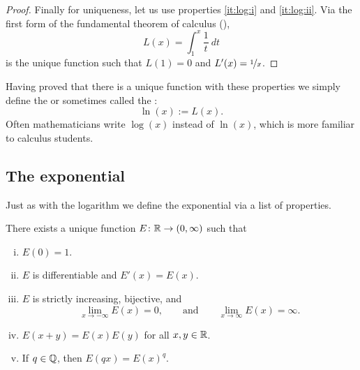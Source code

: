 \begin{proof}
Finally for uniqueness, let us use properties \ref{it:log:i} and
\ref{it:log:ii}.  Via the first form of the
fundamental theorem of calculus (),
\begin{equation*}
L(x) = \int_1^x \frac{1}{t}~dt
\end{equation*}
is the unique function such that $L(1) = 0$ and $L'(x) = \nicefrac{1}{x}$.
\end{proof}

Having proved
that there is a unique function with these properties
we simply define the \emph{} or sometimes called the
\emph{}:
\begin{equation*}
\ln(x) := L(x) .
\end{equation*}
Often mathematicians write $\log(x)$ instead of $\ln(x)$, which is
more familiar to calculus students.

\subsection{The exponential}

Just as with the logarithm we define the exponential via a list of
properties.

\begin{prop}
There exists a unique function $E \colon {\mathbb{R}} \to (0,\infty)$ such that
\begin{enumerate}[(i)]
\item \label{it:exp:i}
$E(0) = 1$.
\item \label{it:exp:ii}
$E$ is differentiable and $E'(x) = E(x)$.
\item \label{it:exp:iii}
$E$ is strictly increasing, bijective, and
\begin{equation*}
\lim_{x\to -\infty} E(x) = 0 , \qquad \text{and} \qquad
\lim_{x\to \infty} E(x) = \infty .
\end{equation*}
\item \label{it:exp:iv}
$E(x+y) = E(x)E(y)$ for all $x,y \in {\mathbb{R}}$.
\item \label{it:exp:v}
If $q \in {\mathbb{Q}}$, then
$E(qx) = {E(x)}^q$.
\end{enumerate}
\end{prop}

